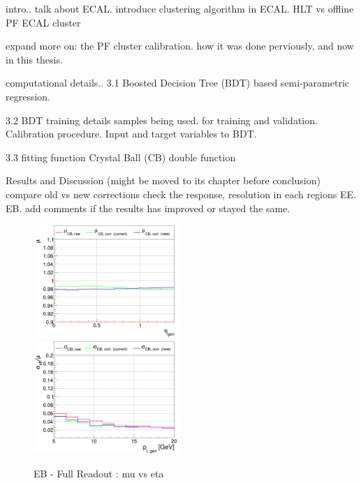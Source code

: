 
intro..
 talk about ECAL.
 introduce clustering algorithm in ECAL.  
 HLT vs offline PF ECAL cluster
 
 expand more on:
  the PF cluster calibration.
  how it was done perviously, and now in this thesis. 
  
computational details.. 
 3.1 Boosted Decision Tree (BDT)
  based semi-parametric regression.

 3.2 BDT training details  
  samples being used. for training and validation.
  Calibration procedure. Input and target variables to BDT.

 3.3 fitting function 
 Crystal Ball (CB) double function
 
Results and Discussion (might be moved to its chapter before conclusion) 
 compare old vs new corrections
 check the response, resolution in each regions EE. EB. add comments if the results has improved or stayed the same. 



\begin{figure}                                                                                                   
\includegraphics[width=0.495\textwidth]{./ECAL_plots/plotsPU/EB/FULL/pdf/EBFULL_GENETA_0005_0020_MuOverBins.pdf}
\includegraphics[width=0.495\textwidth]{./ECAL_plots/plotsPU/EB/FULL/pdf/EBFULL_GENPT_0005_0020_EffSigmaOverBins.pdf}
\caption{EB - Full Readout : mu vs eta}
\end{figure}





